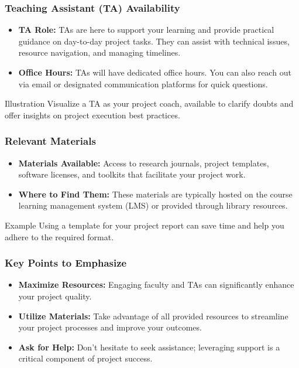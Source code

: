 \documentclass[aspectratio=169]{beamer}
\begin{document}
\begin{frame}[fragile]
    \frametitle{Teaching Assistant (TA) Availability}
    \begin{itemize}
        \item \textbf{TA Role:} TAs are here to support your learning and provide practical guidance on day-to-day project tasks. They can assist with technical issues, resource navigation, and managing timelines.
        \item \textbf{Office Hours:} TAs will have dedicated office hours. You can also reach out via email or designated communication platforms for quick questions.
    \end{itemize}
    
    \begin{block}{Illustration}
        Visualize a TA as your project coach, available to clarify doubts and offer insights on project execution best practices.
    \end{block}
\end{frame}

\begin{frame}[fragile]
    \frametitle{Relevant Materials}
    \begin{itemize}
        \item \textbf{Materials Available:} Access to research journals, project templates, software licenses, and toolkits that facilitate your project work.
        \item \textbf{Where to Find Them:} These materials are typically hosted on the course learning management system (LMS) or provided through library resources.
    \end{itemize}
    
    \begin{block}{Example}
        Using a template for your project report can save time and help you adhere to the required format.
    \end{block}
\end{frame}

\begin{frame}[fragile]
    \frametitle{Key Points to Emphasize}
    \begin{itemize}
        \item \textbf{Maximize Resources:} Engaging faculty and TAs can significantly enhance your project quality.
        \item \textbf{Utilize Materials:} Take advantage of all provided resources to streamline your project processes and improve your outcomes.
        \item \textbf{Ask for Help:} Don’t hesitate to seek assistance; leveraging support is a critical component of project success.
    \end{itemize}
\end{frame}
\end{document}
